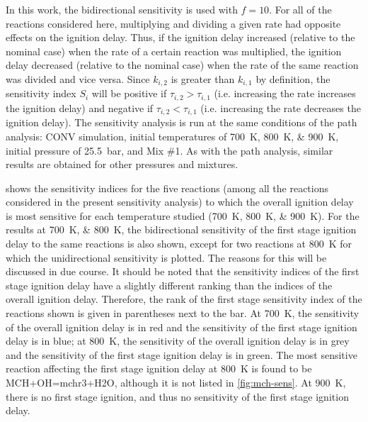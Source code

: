 \documentclass[12pt, letterpaper]{article}
\begin{document}
In this work, the bidirectional sensitivity is used with $f=10$. For all of the
reactions considered here, multiplying and dividing a given rate had opposite
effects on the ignition delay. Thus, if the ignition delay increased (relative
to the nominal case) when the rate of a certain reaction was multiplied, the
ignition delay decreased (relative to the nominal case) when the rate of the
same reaction was divided and vice versa. Since $k_{i,2}$ is greater than
$k_{i,1}$ by definition, the sensitivity index $S_i$ will be positive if
$\tau_{i,2}>\tau_{i,1}$ (i.e. increasing the rate increases the ignition delay)
and negative if $\tau_{i,2}<\tau_{i,1}$ (i.e. increasing the rate decreases the
ignition delay). The sensitivity analysis is run at the same conditions of the
path analysis: CONV simulation, initial temperatures of \SIlist{700;800;900}{\kelvin},
initial pressure of \SI{25.5}{\bar}, and Mix \#1. As with the path analysis, similar
results are obtained for other pressures and mixtures.

 shows the sensitivity indices for the five reactions
(among all the reactions considered in the present sensitivity analysis) to
which the overall ignition delay is most sensitive for each temperature studied
(\SIlist{700;800;900}{\kelvin}). For the results at \SIlist{700;800}{\kelvin}, the
bidirectional sensitivity of the first stage ignition delay to the same
reactions is also shown, except for two reactions at \SI{800}{\kelvin} for which the
unidirectional sensitivity is plotted. The reasons for this will be discussed
in due course. It should be noted that the sensitivity indices of the first
stage ignition delay have a slightly different ranking than the indices of the
overall ignition delay. Therefore, the rank of the first stage sensitivity
index of the reactions shown is given in parentheses next to the bar. At \SI{700}{\kelvin},
the sensitivity of the overall ignition delay is in red and the sensitivity of
the first stage ignition delay is in blue; at \SI{800}{\kelvin}, the sensitivity of the
overall ignition delay is in grey and the sensitivity of the first stage
ignition delay is in green. The most sensitive reaction affecting the first
stage ignition delay at \SI{800}{\kelvin} is found to be MCH+OH=mchr3+H2O, although it is
not listed in \autoref{fig:mch-sens}. At \SI{900}{\kelvin}, there is no first stage
ignition, and thus no sensitivity of the first stage ignition delay.
\end{document}

